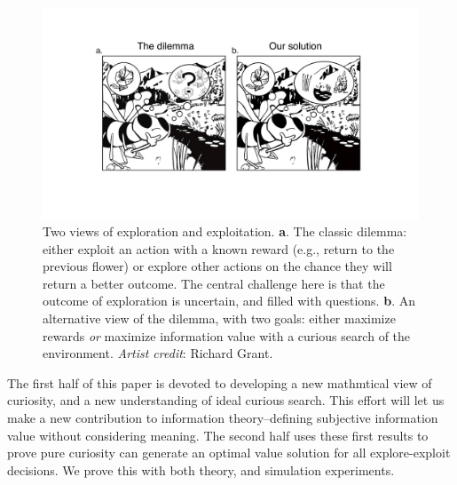 \begin{figure}
	\begin{fullwidth}
	\includegraphics[width=.55\linewidth]{dilemma-draft-elife/img/bee.pdf} 
	\caption{Two views of exploration and exploitation. \textbf{a}. The classic dilemma: either exploit an action with a known reward (e.g., return to the previous flower) or explore other actions on the chance they will return a better outcome. The central challenge here is that the outcome of exploration is uncertain, and filled with questions. \textbf{b}. An alternative view of the dilemma, with two goals: either maximize rewards \textit{or} maximize information value with a curious search of the environment. \textit{Artist credit}: Richard Grant.}
	\label{fig:bee} 
	\end{fullwidth}
\end{figure}

The first half of this paper is devoted to developing a new mathmtical view of curiosity, and a new understanding of ideal curious search. This effort will let us make a new contribution to information theory--defining subjective information value without considering meaning. The second half uses these first results to prove pure curiosity can generate an optimal value solution for all explore-exploit decisions. We prove this with both theory, and simulation experiments.
